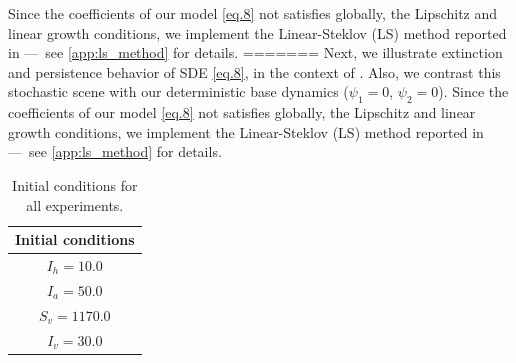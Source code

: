 Since the coefficients of our model \eqref{eq.8} not satisfies globally, the 
Lipschitz and linear growth conditions, we implement the  Linear-Steklov (LS) 
method reported in \cite{Diaz-Infante2016} ---~see \ref{app:ls_method} for 
details.
=======
	Next, we illustrate extinction and persistence behavior of SDE 
\eqref{eq.8}, in the context of .
Also, we contrast this stochastic scene with our deterministic base 
dynamics ($\psi_1=0$, $\psi_2=0$). Since the coefficients of our model 
\eqref{eq.8} not satisfies globally, the Lipschitz and linear growth conditions,
we implement the  Linear-Steklov (LS) method reported in 
\cite{Diaz-Infante2016} ---~see \ref{app:ls_method} for details.
%
%
\begin{table}
	\begin{tabular}{c}
		Initial conditions \\
			\hline
			$I_h = \num{10.0}$		\\
			$I_a = \num{50.0}$		\\
			$S_v = \num{1170.0}$	\\
			$I_v = \num{30.0}$		\\
	\end{tabular}
	\caption{Initial conditions for all experiments.}
\end{table}
%
